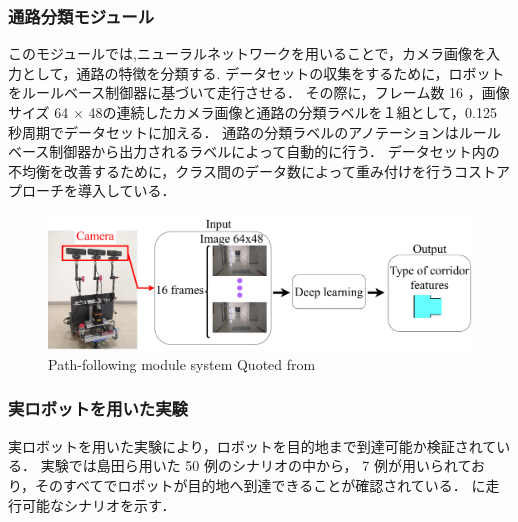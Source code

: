 \subsubsection{通路分類モジュール}
このモジュールでは,ニューラルネットワークを用いることで，カメラ画像を入力として，通路の特徴を分類する.
データセットの収集をするために，ロボットをルールベース制御器に基づいて走行させる．
その際に，フレーム数 16 ，画像サイズ 64 × 48の連続したカメラ画像と通路の分類ラベルを１組として，0.125 秒周期でデータセットに加える．
通路の分類ラベルのアノテーションはルールベース制御器から出力されるラベルによって自動的に行う．
データセット内の不均衡を改善するために，クラス間のデータ数によって重み付けを行うコストアプローチを導入している．

\begin{figure}[htbp]
  \centering
   \includegraphics[width=130mm]{images/pdf/haruyama/intersection_sys.pdf}
   \caption{Path-following module system Quoted from \cite{haruyama2023}}
   \label{fig:intersection}
\end{figure}

\subsubsection{実ロボットを用いた実験}
実ロボットを用いた実験により，ロボットを目的地まで到達可能か検証されている．
実験では島田ら用いた 50 例のシナリオの中から， 7 例が用いられており，そのすべてでロボットが目的地へ到達できることが確認されている．
に走行可能なシナリオを示す．


